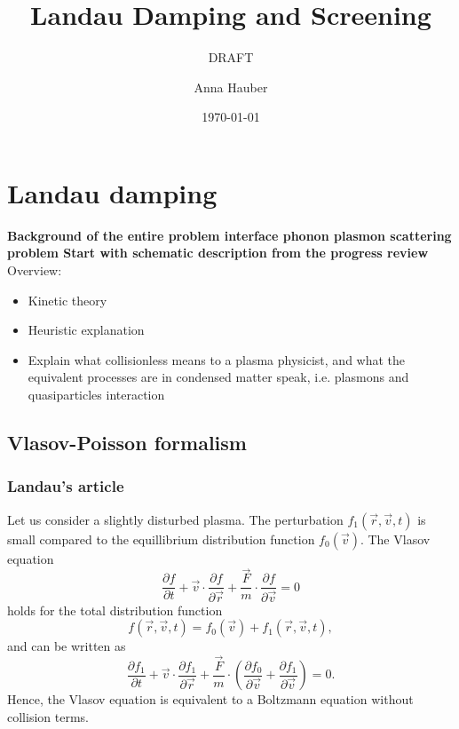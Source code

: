 \documentclass[physics,phd,nolot,nolof]{uccthesis}%
\author{Anna Hauber}
\title{
	Landau Damping and Screening 
}
\subtitle{DRAFT}
\date{\today}
\newcommand{\alert}[1]{\textbf{\color{red}#1}}
\begin{document}
\chapter{Landau damping}
\alert{Background of the entire problem
interface phonon plasmon scattering problem
Start with schematic description from the progress review}
Overview\cite{boydsanderson,bittencourtplasmafundamentals}:
\begin{itemize}
  \item Kinetic theory
  \item Heuristic explanation
  \item	 Explain what collisionless means to a plasma physicist, and what the equivalent processes are in condensed matter speak, i.e. plasmons and quasiparticles interaction 
\end{itemize}
\section{Vlasov-Poisson formalism}
\subsection{Landau's article}
Let us  consider a slightly disturbed plasma.
The perturbation $f_1(\vec r, \vec v, t)$ is small compared to the equillibrium distribution function
$f_0(\vec v)$. 
The Vlasov equation 
\begin{equation}
	\frac{\partial f}{\partial t}+
	\vec{v}\cdot\frac{\partial f}{\partial \vec{r}} +
	\frac{\vec F}{m} \cdot \frac{\partial f}{\partial \vec v} 
	=0
	\label{eq:vlasov}
\end{equation}
holds for the total distribution function
\begin{equation}
	f(\vec r, \vec v,t)=f_0(\vec v)+f_1(\vec r, \vec v, t),
	\label{eq:distributionf}
\end{equation} and can be written as
\begin{equation}
	\frac{\partial f_1}{\partial t}+
	\vec{v}\cdot\frac{\partial f_1}{\partial \vec{r}} +
	\frac{\vec F}{m} \cdot \left( \frac{\partial f_0}{\partial \vec v} +
\frac{\partial f_1}{\partial \vec v} \right)
	=0.
	\label{eq:vlasov2}
\end{equation}
Hence, the Vlasov equation is equivalent to a Boltzmann equation without collision terms.
\end{document}
